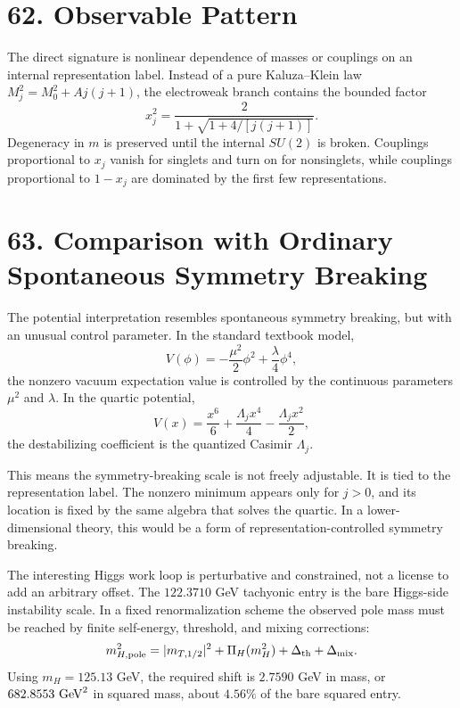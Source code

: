 \documentclass[11pt]{article}
\newcommand{\Lspin}{\Lambda_j}
\begin{document}
\section*{62. Observable Pattern}

The direct signature is nonlinear dependence of masses or couplings on an internal representation label. Instead of a pure Kaluza--Klein law \(M_j^2=M_0^2+A j(j+1)\), the electroweak branch contains the bounded factor
\[
        x_j^2=
        \frac{2}{1+\sqrt{1+4/[j(j+1)]}} .
\]
Degeneracy in \(m\) is preserved until the internal \(SU(2)\) is broken. Couplings proportional to \(x_j\) vanish for singlets and turn on for nonsinglets, while couplings proportional to \(1-x_j\) are dominated by the first few representations.

\section*{63. Comparison with Ordinary Spontaneous Symmetry Breaking}

The potential interpretation resembles spontaneous symmetry breaking, but with an unusual control parameter. In the standard textbook model,
\[
        V(\phi)=-\frac{\mu^2}{2}\phi^2+\frac{\lambda}{4}\phi^4,
\]
the nonzero vacuum expectation value is controlled by the continuous parameters \(\mu^2\) and \(\lambda\). In the quartic potential,
\[
        V(x)=\frac{x^6}{6}+\frac{\Lspin x^4}{4}
        -\frac{\Lspin x^2}{2},
\]
the destabilizing coefficient is the quantized Casimir \(\Lspin\).

This means the symmetry-breaking scale is not freely adjustable. It is tied to the representation label. The nonzero minimum appears only for \(j>0\), and its location is fixed by the same algebra that solves the quartic. In a lower-dimensional theory, this would be a form of representation-controlled symmetry breaking.

The interesting Higgs work loop is perturbative and constrained, not a license to add an arbitrary offset. The \(122.3710\) GeV tachyonic entry is the bare Higgs-side instability scale. In a fixed renormalization scheme the observed pole mass must be reached by finite self-energy, threshold, and mixing corrections:
\[
        m_{H,\rm pole}^2
        =
        |m_{T,1/2}|^2+\Pi_H(m_H^2)+\Delta_{\rm th}+\Delta_{\rm mix}.
\]
Using \(m_H=125.13\) GeV, the required shift is \(2.7590\) GeV in mass, or \(682.8553\ {\rm GeV}^2\) in squared mass, about \(4.56\%\) of the bare squared entry.
\end{document}
